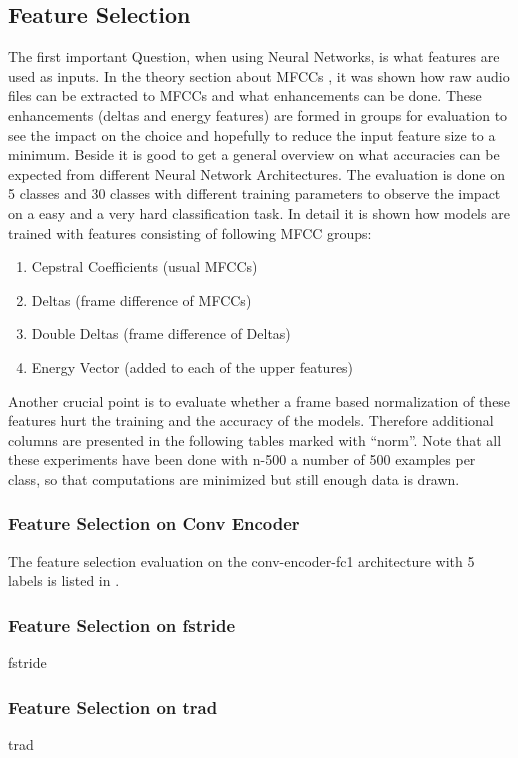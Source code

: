 
\subsection{Feature Selection}
The first important Question, when using Neural Networks, is what features are used as inputs.
In the theory section about MFCCs , it was shown how raw audio files can be extracted to MFCCs and what enhancements can be done.
These enhancements (deltas and energy features) are formed in groups for evaluation to see the impact on the choice and hopefully to reduce the input feature size to a minimum.
Beside it is good to get a general overview on what accuracies can be expected from different Neural Network Architectures.
The evaluation is done on 5 classes and 30 classes with different training parameters to observe the impact on a easy and a very hard classification task.
In detail it is shown how models are trained with features consisting of following MFCC groups:
\begin{enumerate}
    \item Cepstral Coefficients (usual MFCCs)
    \item Deltas (frame difference of MFCCs)
    \item Double Deltas (frame difference of Deltas)
    \item Energy Vector (added to each of the upper features)
\end{enumerate}
Another crucial point is to evaluate whether a frame based normalization of these features hurt the training and the accuracy of the models.
Therefore additional columns are presented in the following tables marked with \enquote{norm}.
Note that all these experiments have been done with n-500 a number of 500 examples per class, so that computations are minimized but still enough data is drawn.

\subsubsection{Feature Selection on Conv Encoder}
The feature selection evaluation on the conv-encoder-fc1 architecture with 5 labels is listed in .
% 
% 
% 




\subsubsection{Feature Selection on fstride}
fstride


\subsubsection{Feature Selection on trad}
trad



